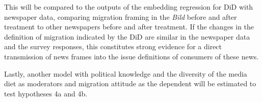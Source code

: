 \documentclass{article}
\begin{document}
This will be compared to the outputs of the embedding regression for DiD with newspaper data, comparing migration framing in the \textit{Bild} before and after treatment to other newspapers before and after treatment. If the changes in the definition of migration indicated by the DiD are similar in the newspaper data and the survey responses, this constitutes strong evidence for a direct transmission of news frames into the issue definitions of consumers of these news.

Lastly, another model with political knowledge and the diversity of the media diet as moderators and migration attitude as the dependent will be estimated to test hypotheses 4a and 4b.


\newpage

\printbibliography
\end{document}
